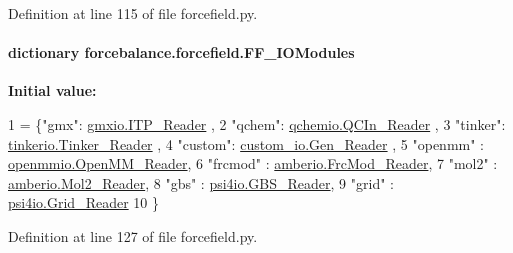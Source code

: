 Definition at line 115 of file forcefield.\-py.

\hypertarget{namespaceforcebalance_1_1forcefield_a3beac9806e0438b79b9ae60a47c7b131}{
\paragraph[{F\-F\-\_\-\-I\-O\-Modules}]{\setlength{\rightskip}{0pt plus 5cm}dictionary forcebalance.\-forcefield.\-F\-F\-\_\-\-I\-O\-Modules}}\label{namespaceforcebalance_1_1forcefield_a3beac9806e0438b79b9ae60a47c7b131}
{\bfseries Initial value\-:}
\begin{DoxyCode}
1 = \{\textcolor{stringliteral}{"gmx"}: \hyperlink{classforcebalance_1_1gmxio_1_1ITP__Reader}{gmxio.ITP\_Reader} ,
2                 \textcolor{stringliteral}{"qchem"}: \hyperlink{classforcebalance_1_1qchemio_1_1QCIn__Reader}{qchemio.QCIn\_Reader} ,
3                 \textcolor{stringliteral}{"tinker"}: \hyperlink{classforcebalance_1_1tinkerio_1_1Tinker__Reader}{tinkerio.Tinker\_Reader} ,
4                 \textcolor{stringliteral}{"custom"}: \hyperlink{classforcebalance_1_1custom__io_1_1Gen__Reader}{custom\_io.Gen\_Reader} , 
5                 \textcolor{stringliteral}{"openmm"} : \hyperlink{classforcebalance_1_1openmmio_1_1OpenMM__Reader}{openmmio.OpenMM\_Reader},
6                 \textcolor{stringliteral}{"frcmod"} : \hyperlink{classforcebalance_1_1amberio_1_1FrcMod__Reader}{amberio.FrcMod\_Reader},
7                 \textcolor{stringliteral}{"mol2"} : \hyperlink{classforcebalance_1_1amberio_1_1Mol2__Reader}{amberio.Mol2\_Reader},
8                 \textcolor{stringliteral}{"gbs"} : \hyperlink{classforcebalance_1_1psi4io_1_1GBS__Reader}{psi4io.GBS\_Reader},
9                 \textcolor{stringliteral}{"grid"} : \hyperlink{classforcebalance_1_1psi4io_1_1Grid__Reader}{psi4io.Grid\_Reader}
10                 \}
\end{DoxyCode}


Definition at line 127 of file forcefield.\-py.

